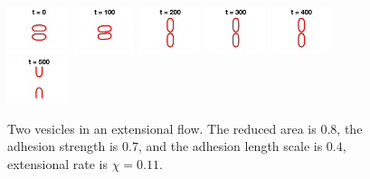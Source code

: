 \documentclass[%
preprint,
 amsmath,amssymb,
 aps,
]{revtex4-1}
\begin{document}
\begin{figure}[htp]
  \includegraphics[width = 0.16\textwidth]{figs/extensional_adR4em1adS7em1Chi1p1em1_ra080_image01.png}
  \includegraphics[width = 0.16\textwidth]{figs/extensional_adR4em1adS7em1Chi1p1em1_ra080_image02.png}
  \includegraphics[width = 0.16\textwidth]{figs/extensional_adR4em1adS7em1Chi1p1em1_ra080_image03.png}
  \includegraphics[width = 0.16\textwidth]{figs/extensional_adR4em1adS7em1Chi1p1em1_ra080_image04.png}
  \includegraphics[width = 0.16\textwidth]{figs/extensional_adR4em1adS7em1Chi1p1em1_ra080_image05.png}
  \includegraphics[width = 0.16\textwidth]{figs/extensional_adR4em1adS7em1Chi1p1em1_ra080_image06.png}
  \caption{Two vesicles in an extensional flow.  The reduced area is
  $0.8$, the adhesion strength is $0.7$, and the adhesion length scale
is $0.4$, extensional rate is $\chi = 0.11$.}
\end{figure}
\end{document}

